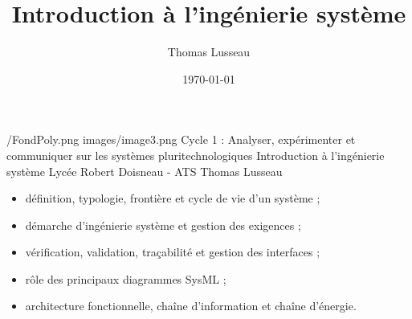 
\titlehead{Thomas Lusseau - SII en ATS}
\title[Introduction à l'ingénierie système]{Introduction à l'ingénierie système}
\author[TL]{Thomas Lusseau}
\date{\today}

\TLCourseCoverSetup
  {\repStyle/FondPoly.png}
  {images/image3.png}
  {Cycle 1 : Analyser, expérimenter et\\ communiquer sur les systèmes pluritechnologiques}
  {Introduction à l'ingénierie système}
  {Lycée Robert Doisneau - ATS}
  {Thomas Lusseau}


\TLCourseFooter
\TLCourseCover
{}

\livrettrue
\collefalse


\begin{savoirs}
\begin{itemize}
  \item définition, typologie, frontière et cycle de vie d'un système ;
  \item démarche d'ingénierie système et gestion des exigences ;
  \item vérification, validation, traçabilité et gestion des interfaces ;
  \item rôle des principaux diagrammes SysML ;
  \item architecture fonctionnelle, chaîne d'information et chaîne d'énergie.
\end{itemize}
\end{savoirs}

